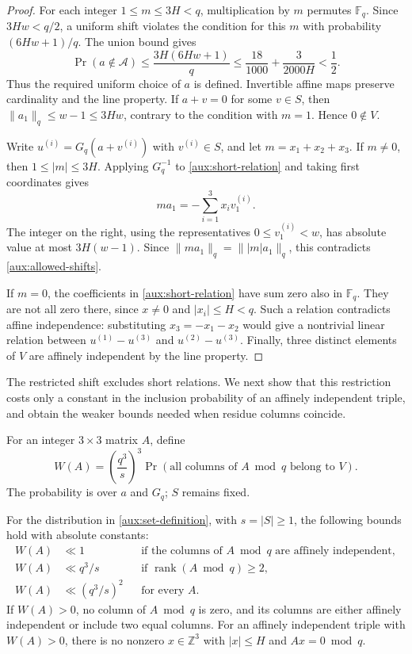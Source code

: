 \begin{proof}
For each integer $1\le m\le3H<q$, multiplication by $m$ permutes
$\mathbb F_q$.  Since $3Hw<q/2$, a uniform shift violates the
condition for this $m$ with probability $(6Hw+1)/q$.  The union bound
gives
\[
 \Pr(a\notin\mathcal A)
 \le\frac{3H(6Hw+1)}{q}
 \le\frac{18}{1000}+\frac{3}{2000H}<\frac12.
\]
Thus the required uniform choice of $a$ is defined.  Invertible affine
maps preserve cardinality and the line property.  If $a+v=0$ for some
$v\in S$, then $\|a_1\|_q\le w-1\le3Hw$, contrary to the condition
with $m=1$.  Hence $0\notin V$.

Write $u^{(i)}=G_q(a+v^{(i)})$ with $v^{(i)}\in S$, and let
$m=x_1+x_2+x_3$.  If $m\ne0$, then $1\le |m|\le3H$.
Applying $G_q^{-1}$ to \eqref{aux:short-relation} and taking first
coordinates gives
\[
 ma_1=-\sum_{i=1}^3x_i v^{(i)}_1.
\]
The integer on the right, using the representatives
$0\le v^{(i)}_1<w$, has absolute value at most $3H(w-1)$.
Since $\|ma_1\|_q=\||m|a_1\|_q$, this contradicts
\eqref{aux:allowed-shifts}.

If $m=0$, the coefficients in \eqref{aux:short-relation} have sum
zero also in $\mathbb F_q$.  They are not all zero there, since
$x\ne0$ and $|x_i|\le H<q$.  Such a relation contradicts affine
independence: substituting $x_3=-x_1-x_2$ would give a nontrivial
linear relation between $u^{(1)}-u^{(3)}$ and
$u^{(2)}-u^{(3)}$.  Finally, three distinct elements of $V$ are
affinely independent by the line property.
\end{proof}

The restricted shift excludes short relations.  We next show that
this restriction costs only a constant in the inclusion probability
of an affinely independent triple, and obtain the weaker bounds
needed when residue columns coincide.

For an integer $3\times3$ matrix $A$, define
\begin{equation}\label{aux:weight}
 W(A)=\left(\frac{q^3}{s}\right)^3
       \Pr(\text{all columns of }A\bmod q\text{ belong to }V).
\end{equation}
The probability is over $a$ and $G_q$; $S$ remains fixed.

\begin{proposition}\label{aux:weights}
For the distribution in \eqref{aux:set-definition}, with
$s=|S|\ge1$, the following bounds hold with absolute constants:
\begin{equation}\label{aux:weight-bounds}
 \begin{aligned}
 W(A)&\ll1
   &&\text{if the columns of }A\bmod q\text{ are affinely independent},\\
 W(A)&\ll q^3/s
   &&\text{if }\operatorname{rank}(A\bmod q)\ge2,\\
 W(A)&\ll(q^3/s)^2
   &&\text{for every }A.
 \end{aligned}
\end{equation}
If $W(A)>0$, no column of $A\bmod q$ is zero, and its columns are
either affinely independent or include two equal columns.  For an
affinely independent triple with $W(A)>0$, there is no nonzero
$x\in\mathbb Z^3$ with $|x|\le H$ and $Ax=0\bmod q$.
\end{proposition}

